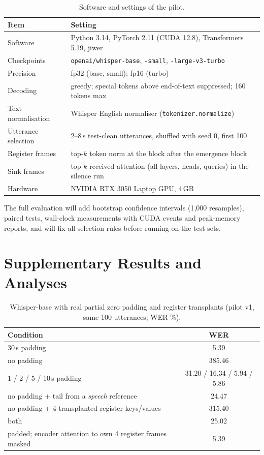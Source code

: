 \begin{table}[!htbp]
\centering
\small
\setlength{\tabcolsep}{8pt}
\caption{Software and settings of the pilot.}
\label{tab:implementation}
\begin{tabular}{l l}
\toprule
\textbf{Item} & \textbf{Setting} \\
\midrule
Software & Python 3.14, PyTorch 2.11 (CUDA 12.8), Transformers 5.19, jiwer \\
Checkpoints & \texttt{openai/whisper-base}, \texttt{-small}, \texttt{-large-v3-turbo} \\
Precision & fp32 (base, small); fp16 (turbo) \\
Decoding & greedy; special tokens above end-of-text suppressed; 160 tokens max \\
Text normalisation & Whisper English normaliser (\texttt{tokenizer.normalize}) \\
Utterance selection & 2--8\,s test-clean utterances, shuffled with seed 0, first 100 \\
Register frames & top-$k$ token norm at the block after the emergence block \\
Sink frames & top-$k$ received attention (all layers, heads, queries) in the silence run \\
Hardware & NVIDIA RTX 3050 Laptop GPU, 4\,GB \\
\bottomrule
\end{tabular}
\end{table}

The full evaluation will add bootstrap confidence intervals (1{,}000 resamples), paired tests, wall-clock measurements with CUDA events and peak-memory reports, and will fix all selection rules before running on the test sets.

\FloatBarrier

\section{Supplementary Results and Analyses}
\label{app:supp-results}

\begin{table}[!htbp]
\centering
\small
\setlength{\tabcolsep}{8pt}
\caption{Whisper-base with real partial zero padding and register transplants (pilot v1, same 100 utterances; WER \%).}
\label{tab:supp-results}
\begin{tabular}{l c}
\toprule
\textbf{Condition} & \textbf{WER} \\
\midrule
30\,s padding & 5.39 \\
no padding & 385.46 \\
1 / 2 / 5 / 10\,s padding & 31.20 / 16.34 / 5.94 / 5.86 \\
no padding + tail from a \emph{speech} reference & 24.47 \\
no padding + 4 transplanted register keys/values & 315.40 \\
both & 25.02 \\
padded; encoder attention to own 4 register frames masked & 5.39 \\
\bottomrule
\end{tabular}
\end{table}

